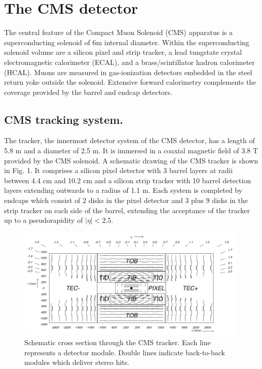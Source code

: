 \section{The CMS detector}

The central feature of the Compact Muon Solenoid (CMS) apparatus is a superconducting solenoid of 6\unit{m} internal diameter. Within the superconducting solenoid volume are a silicon pixel and strip tracker, a lead tungstate crystal electromagnetic calorimeter (ECAL), and a brass/scintillator hadron calorimeter (HCAL). Muons are measured in gas-ionization detectors embedded in the steel return yoke outside the solenoid. Extensive forward calorimetry complements the coverage provided by the barrel and endcap detectors. 

\subsection{CMS tracking system.}

The tracker, the innermost detector system of the CMS detector, has a length
of 5.8 m and a
diameter of 2.5 m. It is immersed in a coaxial magnetic field of 3.8 T
provided by the CMS solenoid. A schematic drawing of the CMS tracker is shown in
Fig. 1. It comprises a silicon pixel detector with 3 barrel layers at radii
between 4.4 cm and 10.2 cm and a silicon strip tracker with 10 barrel
detection layers extending outwards to a radius of 1.1 m. Each system is
completed by endcaps which consist of 2 disks in the pixel detector and 3
plus 9 disks in the strip tracker on each side of the barrel, extending
the acceptance of the tracker up to a pseudorapidity of $|\eta| < 2.5$.
\begin{figure}[!h]
\centering
\includegraphics[width=0.99\textwidth]{plots/intro/tracker.png}
\caption{Schematic cross section through the CMS tracker. Each line represents a
detector module. Double lines indicate back-to-back modules which deliver stereo
hits.}
\end{figure}


